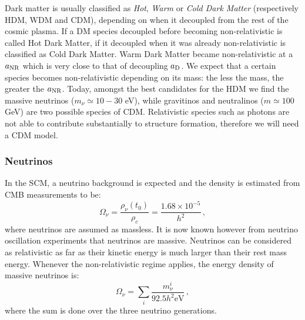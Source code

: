 Dark matter is usually classified as \emph{Hot}, \emph{Warm} or \emph{Cold Dark Matter} (respectively HDM, WDM and CDM), depending on when it decoupled from the rest of the cosmic plasma. If a DM species decoupled before becoming non-relativistic is called Hot Dark Matter, if it decoupled when it was already non-relativistic is classified as Cold Dark Matter. Warm Dark Matter became non-relativistic at a $a_{\rm NR}$ which is very close to that of decoupling $a_{\rm D}$. We expect that a certain species becomes non-relativistic depending on its mass: the less the mass, the greater the $a_{\rm NR}$. Today, amongst the best candidates for the HDM we find the massive neutrinos ($m_{\nu} \simeq 10-30$ eV), while gravitinos and neutralinos ($m\simeq 100$ GeV) are two possible species of CDM. Relativistic species such as photons are not able to contribute substantially to structure formation, therefore we will need a CDM model.

\subsubsection{Neutrinos}
In the SCM, a neutrino background is expected and %
the density is estimated from CMB measurements to be:
\begin{equation}
\Omega_{\nu}=\frac{\rho_{\nu}(t_0)}{\rho_c}=\frac{1.68\times 10^{-5}}{h^2}\,,
\end{equation}where neutrinos are assumed as massless. It is now known however from neutrino oscillation experiments that neutrinos are massive. %
Neutrinos can be considered as relativistic as far as their kinetic energy is much larger than their rest mass energy. Whenever the non-relativistic regime applies, the energy density of massive neutrinos is:
\begin{equation}
\Omega_{\nu}=\sum_i\frac{m_{\nu}^i}{92.5 h^2 \textrm{eV}}\,,
\end{equation}where the sum is done over the three neutrino generations. 

